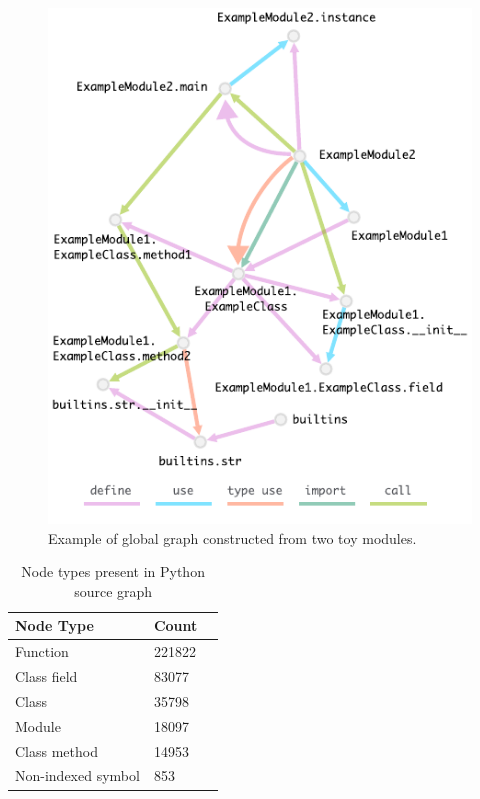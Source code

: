 \documentclass[a4paper,twoside]{article}
\begin{document}
\begin{figure}
    \centering
    \includegraphics{python_graph_example.pdf}
    \caption{Example of global graph constructed from two toy modules.}\label{fig:python_graph}
\end{figure}

\begin{table}[]
\centering
\begin{tabular}{lll}
    \toprule
    Node Type        & Count  \\ \midrule
    Function        & 221822 \\ \midrule
    Class field     & 83077 \\ \midrule
    Class           & 35798 \\ \midrule
    Module          & 18097 \\ \midrule
    Class method    & 14953 \\ \midrule
    Non-indexed symbol  & 853  \\ \bottomrule
\end{tabular}
\caption{Node types present in Python source graph\label{tbl:python_node_count}}
\end{table}
\end{document}
